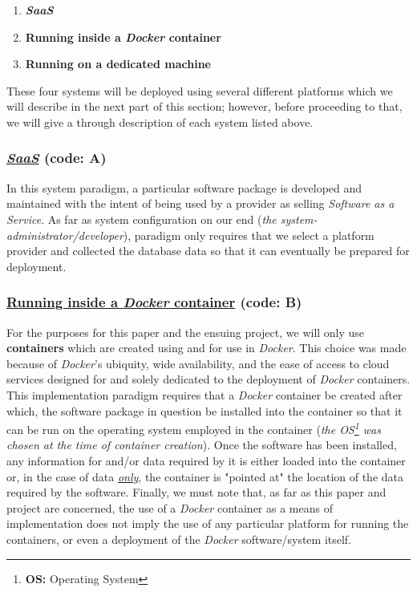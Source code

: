 \begin{spacing}{1.30}
\begin{enumerate}[label=\Large{\textbf{\Alph*}):}]
	\item \textbf{\emph{SaaS}}
	\item \textbf{Running inside a \emph{Docker} container}
	\item \textbf{Running on a dedicated machine}
\end{enumerate}
\end{spacing}

These four systems will be deployed using several different platforms which we will describe in the next part of this section; however, before proceeding to that, we will give a through description of each system listed above.


\subsubsection{\underline{\emph{SaaS}} (code: \textbf{A}) }
In this system paradigm, a particular software package is developed and maintained with the intent of being used by a provider as selling \emph{Software as a Service}. As far as system configuration on our end (\emph{the system-administrator/developer}), paradigm only requires that we select a platform provider and collected the database data so that it can eventually be prepared for deployment.


\subsubsection{\underline{Running inside a \emph{Docker} container} (code: \textbf{B}) }
For the purposes for this paper and the ensuing project, we will only use \textbf{containers} which are created using and for use in \emph{Docker}.  This choice was made because of \emph{Docker}'s ubiquity, wide availability, and the ease of access to cloud services designed for and solely dedicated to the deployment of \emph{Docker} containers.  This implementation paradigm requires that a \emph{Docker} container be created after which, the software package in question be installed into the container so that it can be run on the operating system employed in the container (\emph{the OS\footnote{\textbf{OS: } Operating System} was chosen at the time of container creation}). Once the software has been installed, any information for and/or data required by it is either loaded into the container or, in the case of data \underline{\emph{only}}, the container is "pointed at" the location of the data required by the software.  Finally, we must note that, as far as this paper and project are concerned, the use of a \emph{Docker} container as a means of implementation does not imply the use of any particular platform for running the containers, or even a deployment of the \emph{Docker} software/system itself. 


